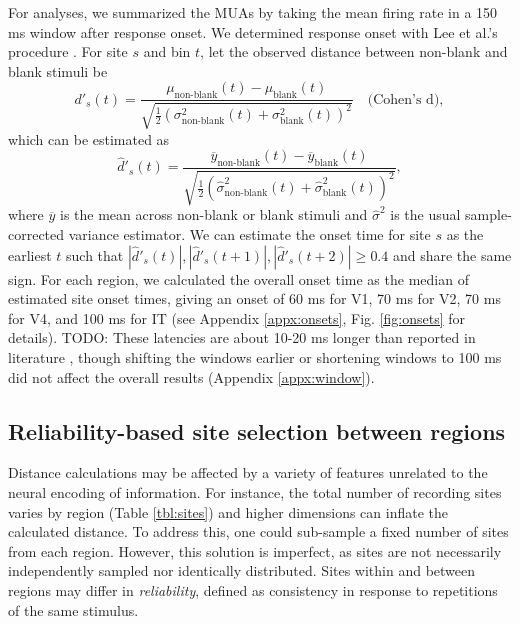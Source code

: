 \documentclass[draft]{cmustatproposal} %
\newcommand{\todo}[1]{{\color{purple}#1}}
\begin{document}
For analyses, we summarized the MUAs by taking the mean firing rate in a 150 ms window after response onset.
We determined response onset with Lee et al.'s procedure \cite{lee_developmentally_2024}. For site \( s \) and bin \( t \), let the observed distance between non-blank and blank stimuli be
\begin{equation}
d'_s (t) = 
\frac{\mu_{\textrm{non-blank}} (t) - \mu_{\textrm{blank}} (t) }
{\sqrt{\frac{1}{2} \left( \sigma^2_{\textrm{non-blank}} (t) + \sigma^2_{\textrm{blank}} (t) \right)^2 }} \quad \textrm{(Cohen's d)},
\end{equation}
which can be estimated as
\begin{equation*}
\hat{d}'_s (t) = 
\frac{\overline{y}_{\textrm{non-blank}} (t) - \overline{y}_{\textrm{blank}} (t) }
{\sqrt{\frac{1}{2} \left( \hat\sigma^2_{\textrm{non-blank}} (t) + \hat\sigma^2_{\textrm{blank}} (t) \right)^2 }},
\end{equation*}
where \( \overline{y} \) is the mean across non-blank or blank stimuli and \( \hat\sigma^2 \) is the usual sample-corrected variance estimator. We can estimate the onset time for site \( s \) as the earliest \( t \) such that \( |\hat{d}'_s (t) |, |\hat{d}'_s (t + 1)|, |\hat{d}'_s (t + 2)| \geq 0.4 \) and share the same sign. For each region, we calculated the overall onset time as the median of estimated site onset times, giving an onset of 60 ms for V1, 70 ms for V2, 70 ms for V4, and 100 ms for IT (see Appendix \ref{appx:onsets}, Fig. \ref{fig:onsets} for details). \todo{TODO: These latencies are about 10-20 ms longer than reported in literature \cite{dicarlo_how_2012}, though shifting the windows earlier or shortening windows to 100 ms did not affect the overall results (Appendix \ref{appx:window}).}

\subsection{Reliability-based site selection between regions}

Distance calculations may be affected by a variety of features \todo{unrelated to the neural encoding of information}. For instance, the total number of recording sites varies by region (Table \ref{tbl:sites}) and higher dimensions can inflate the calculated distance. To address this, one could sub-sample a fixed number of sites from each region. However, this solution is imperfect, as sites are not necessarily independently sampled nor identically distributed. Sites within and between regions may differ in \textit{reliability}, \todo{defined as consistency in response to repetitions of the same stimulus.}
\end{document}
